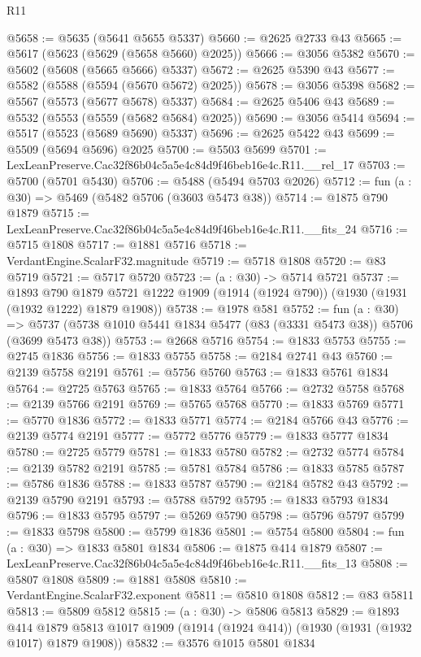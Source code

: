 \begin{lexlean}{R11}
\begin{coremodule}
@5658 := @5635 (@5641 @5655 @5337)
@5660 := @2625 @2733 @43
@5665 := @5617 (@5623 (@5629 (@5658 @5660) @2025))
@5666 := @3056 @5382
@5670 := @5602 (@5608 (@5665 @5666) @5337)
@5672 := @2625 @5390 @43
@5677 := @5582 (@5588 (@5594 (@5670 @5672) @2025))
@5678 := @3056 @5398
@5682 := @5567 (@5573 (@5677 @5678) @5337)
@5684 := @2625 @5406 @43
@5689 := @5532 (@5553 (@5559 (@5682 @5684) @2025))
@5690 := @3056 @5414
@5694 := @5517 (@5523 (@5689 @5690) @5337)
@5696 := @2625 @5422 @43
@5699 := @5509 (@5694 @5696) @2025
@5700 := @5503 @5699
@5701 := LexLeanPreserve.Cac32f86b04c5a5e4c84d9f46beb16e4c.R11.__rel_17
@5703 := @5700 (@5701 @5430)
@5706 := @5488 (@5494 @5703 @2026)
@5712 := fun (a : @30) => @5469 (@5482 @5706 (@3603 @5473 @38))
@5714 := @1875 @790 @1879
@5715 := LexLeanPreserve.Cac32f86b04c5a5e4c84d9f46beb16e4c.R11.__fits_24
@5716 := @5715 @1808
@5717 := @1881 @5716
@5718 := VerdantEngine.ScalarF32.magnitude
@5719 := @5718 @1808
@5720 := @83 @5719
@5721 := @5717 @5720
@5723 := (a : @30) -> @5714 @5721
@5737 := @1893
    @790
    @1879
    @5721
    @1222
    @1909
    (@1914 (@1924 @790))
    (@1930 (@1931 (@1932 @1222) @1879 @1908))
@5738 := @1978 @581
@5752 := fun (a : @30) =>
  @5737 (@5738 @1010 @5441 @1834 @5477 (@83 (@3331 @5473 @38)) @5706 (@3699 @5473 @38))
@5753 := @2668 @5716
@5754 := @1833 @5753
@5755 := @2745 @1836
@5756 := @1833 @5755
@5758 := @2184 @2741 @43
@5760 := @2139 @5758 @2191
@5761 := @5756 @5760
@5763 := @1833 @5761 @1834
@5764 := @2725 @5763
@5765 := @1833 @5764
@5766 := @2732 @5758
@5768 := @2139 @5766 @2191
@5769 := @5765 @5768
@5770 := @1833 @5769
@5771 := @5770 @1836
@5772 := @1833 @5771
@5774 := @2184 @5766 @43
@5776 := @2139 @5774 @2191
@5777 := @5772 @5776
@5779 := @1833 @5777 @1834
@5780 := @2725 @5779
@5781 := @1833 @5780
@5782 := @2732 @5774
@5784 := @2139 @5782 @2191
@5785 := @5781 @5784
@5786 := @1833 @5785
@5787 := @5786 @1836
@5788 := @1833 @5787
@5790 := @2184 @5782 @43
@5792 := @2139 @5790 @2191
@5793 := @5788 @5792
@5795 := @1833 @5793 @1834
@5796 := @1833 @5795
@5797 := @5269 @5790
@5798 := @5796 @5797
@5799 := @1833 @5798
@5800 := @5799 @1836
@5801 := @5754 @5800
@5804 := fun (a : @30) => @1833 @5801 @1834
@5806 := @1875 @414 @1879
@5807 := LexLeanPreserve.Cac32f86b04c5a5e4c84d9f46beb16e4c.R11.__fits_13
@5808 := @5807 @1808
@5809 := @1881 @5808
@5810 := VerdantEngine.ScalarF32.exponent
@5811 := @5810 @1808
@5812 := @83 @5811
@5813 := @5809 @5812
@5815 := (a : @30) -> @5806 @5813
@5829 := @1893
    @414
    @1879
    @5813
    @1017
    @1909
    (@1914 (@1924 @414))
    (@1930 (@1931 (@1932 @1017) @1879 @1908))
@5832 := @3576 @1015 @5801 @1834

\end{coremodule}
\end{lexlean}
